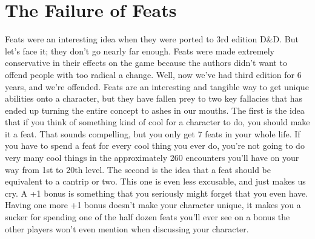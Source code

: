 



\section{The Failure of Feats}
\vspace*{-10pt}

Feats were an interesting idea when they were ported to 3rd edition D\&D. But let's face it; they don't go nearly far enough. Feats were made extremely conservative in their effects on the game because the authors didn't want to offend people with too radical a change. Well, now we've had third edition for 6 years, and we're offended. Feats are an interesting and tangible way to get unique abilities onto a character, but they have fallen prey to two key fallacies that has ended up turning the entire concept to ashes in our mouths. The first is the idea that if you think of something kind of cool for a character to do, you should make it a feat. That sounds compelling, but you only get 7 feats in your whole life. If you have to spend a feat for every cool thing you ever do, you're not going to do very many cool things in the approximately 260 encounters you'll have on your way from 1st to 20th level. The second is the idea that a feat should be equivalent to a cantrip or two. This one is even less excusable, and just makes us cry. A +1 bonus is something that you seriously might forget that you even have. Having one more +1 bonus doesn't make your character unique, it makes you a sucker for spending one of the half dozen feats you'll ever see on a bonus the other players won't even mention when discussing your character.

